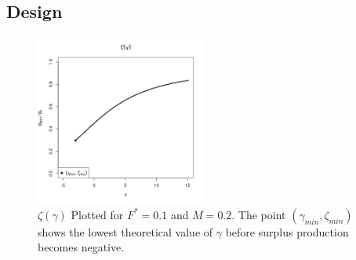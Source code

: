 %
\clearpage
\subsection{Design \label{sLHS}}

%
\begin{figure}
\includegraphics[width=0.5\textwidth]{../gpBias/zeta.png}
\vspace*{-1.3cm}
\caption{$\zeta(\gamma)$ Plotted for $F^*=0.1$ and $M=0.2$. The point
$(\gamma_{min}, \zeta_{min})$ shows the lowest %
theoretical value of $\gamma$ before surplus production becomes negative.}
\end{figure}



